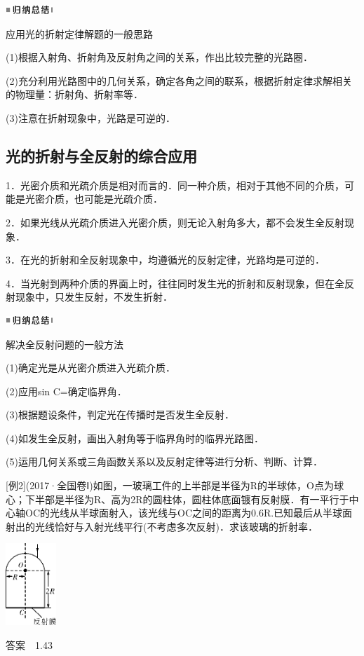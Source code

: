 \begin{center}\includegraphics[width=0.70764in,height=0.12292in]{media/image13.png}\end{center}
应用光的折射定律解题的一般思路

(1)根据入射角、折射角及反射角之间的关系，作出比较完整的光路圈．

(2)充分利用光路图中的几何关系，确定各角之间的联系，根据折射定律求解相关的物理量：折射角、折射率等．

(3)注意在折射现象中，光路是可逆的．

\subsection{光的折射与全反射的综合应用}

1．光密介质和光疏介质是相对而言的．同一种介质，相对于其他不同的介质，可能是光密介质，也可能是光疏介质．

2．如果光线从光疏介质进入光密介质，则无论入射角多大，都不会发生全反射现象．

3．在光的折射和全反射现象中，均遵循光的反射定律，光路均是可逆的．

4．当光射到两种介质的界面上时，往往同时发生光的折射和反射现象，但在全反射现象中，只发生反射，不发生折射．

\begin{center}\includegraphics[width=0.70764in,height=0.12292in]{media/image13.png}\end{center}
解决全反射问题的一般方法

(1)确定光是从光密介质进入光疏介质．

(2)应用sin C=确定临界角．

(3)根据题设条件，判定光在传播时是否发生全反射．

(4)如发生全反射，画出入射角等于临界角时的临界光路图．

(5)运用几何关系或三角函数关系以及反射定律等进行分析、判断、计算．

{[}例2{]}(2017·全国卷Ⅰ)如图，一玻璃工件的上半部是半径为R的半球体，O点为球心；下半部是半径为R、高为2R的圆柱体，圆柱体底面镀有反射膜．有一平行于中心轴OC的光线从半球面射入，该光线与OC之间的距离为0.6R.已知最后从半球面射出的光线恰好与入射光线平行(不考虑多次反射)．求该玻璃的折射率．

\begin{center}\includegraphics[width=0.75486in,height=1.21667in]{media/image549.png}\end{center}
答案　1.43

